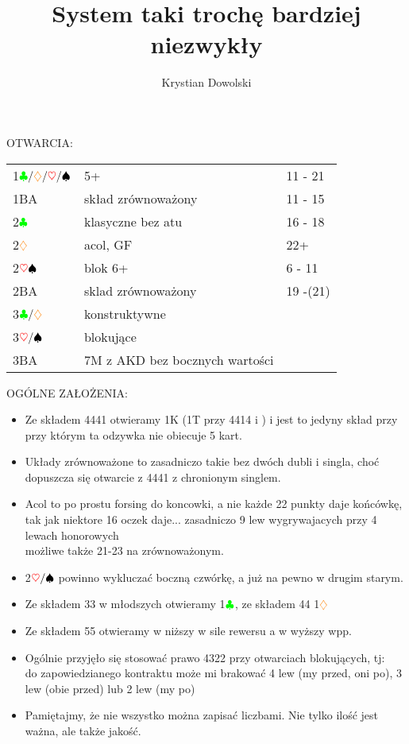 \documentclass[a4paper,11pt]{article}
\date{}
\author{Krystian Dowolski}
\title{System taki trochę bardziej niezwykły}
\newcommand{\CC}{\textcolor{green}\clubsuit}
\newcommand{\DD}{\textcolor{orange}\diamondsuit}
\newcommand{\HH}{\textcolor{red}\heartsuit}
\newcommand{\PP}{\textcolor{black}\spadesuit}
\begin{document}
 
\maketitle 
\begin{center}\LARGE{OTWARCIA:}\\
\end{center}


\begin{tabular}{p{2cm} p{10cm} l}
	1$\CC/\DD/\HH/\PP$ & 5+ & 11 - 21\\
	1BA & skład zrównoważony & 11 - 15\\
	2$\CC$ & klasyczne bez atu & 16 - 18\\
	2$\DD$ & acol, GF & 22+\\
	2$\HH\PP$ & blok 6+ & 6 - 11\\
	2BA & sklad zrównoważony & 19 -(21)\\
	3$\CC/\DD$ & konstruktywne\footnotemark\\
	3$\HH/\PP$ & blokujące\\
	3BA\footnotemark & 7M z AKD bez bocznych wartości\\
\end{tabular}

\begin{center}\LARGE{OGÓLNE ZAŁOŻENIA:}\\
\end{center}
\begin{itemize}
\item Ze składem 4441 otwieramy 1K (1T przy 4414 i ) i jest to jedyny skład przy
przy którym ta odzywka nie obiecuje 5 kart. 
\item Układy zrównoważone to zasadniczo takie bez dwóch dubli i singla,
choć dopuszcza się otwarcie z 4441 z chronionym singlem.
\item Acol to po prostu forsing do koncowki, a nie każde 22 punkty daje końcówkę,
tak jak niektore 16 oczek daje... zasadniczo 9 lew wygrywajacych przy 4 lewach honorowych \\
możliwe także 21-23 na zrównoważonym.
\item 2$\HH/\PP$ powinno wykluczać boczną czwórkę, a już na pewno w drugim starym.
\item Ze składem 33 w młodszych otwieramy 1$\CC$, ze składem 44 1$\DD$
\item Ze składem 55 otwieramy w niższy w sile rewersu a w wyższy wpp.
\item Ogólnie przyjęło się stosować prawo 4322 przy otwarciach blokujących, tj: \\
do zapowiedzianego kontraktu może mi brakować 4 lew (my przed, oni po), 3 lew (obie przed)
lub 2 lew (my po)
\item Pamiętajmy, że nie wszystko można zapisać liczbami. Nie tylko ilość jest ważna, ale także jakość.
\end{itemize}
\newpage
\end{document}
